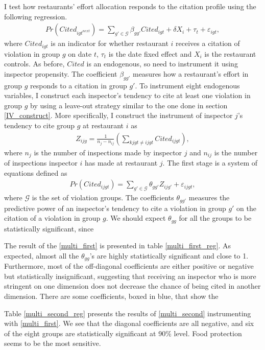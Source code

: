 \documentclass[11pt]{article}
\begin{document}
I test how restaurants' effort allocation responds to the citation profile using the following regression. 
\begin{align}
\label{multi_second}
    Pr(Cited_{igt^{next}}) = \sum_{g' \in \mathcal{G}} \beta_{gg'} Cited_{igt} + \delta X_i + \tau_t + \varepsilon_{igt},
\end{align}
where $Cited_{igt}$ is an indicator for whether restaurant $i$ receives a citation of violation in group $g$ on date $t$, $\tau_t$ is the date fixed effect and $X_i$ is the restaurant controls. As before, $Cited$ is an endogenous, so need to instrument it using inspector propensity. The coefficient $\beta_{gg'}$ measures how a restaurant's effort in group $g$ responds to a citation in group $g'$. To instrument eight endogenous variables, I construct each inspector's tendency to cite at least one violation in group $g$ by using a leave-out strategy similar to the one done in section \ref{IV_construct}. More specifically, I construct the instrument of inspector $j$'s tendency to cite group $g$ at restaurant $i$ as
\begin{align*}
  Z_{ijg} = \frac{1}{n_j - n_{ij}} \left(\sum_{kjgt \neq ijgt} Cited_{ijgt}\right),
\end{align*}
where $n_j$ is the number of inspections made by inspector $j$ and $n_{ij}$ is the number of inspections inspector $i$ has made at restaurant $j$. The first stage is a system of equations defined as
\begin{align}
\label{multi_first}
    Pr(Cited_{ijgt}) = \sum_{g'\in \mathcal{G}} \theta_{gg'}Z_{ijg'} + \varepsilon_{ijgt}, 
\end{align}
where $\mathcal{G}$ is the set of violation groups. The coefficients $\theta_{gg'}$ measures the predictive power of an inspector's tendency to cite a violation in group $g'$ on the citation of a violation in group $g$. We should expect $\theta_{gg}$ for all the groups to be statistically significant, since 

The result of the \eqref{multi_first} is presented in table \ref{multi_first_reg}. As expected, almost all the $\theta_{gg}$'s are highly statistically significant and close to 1. Furthermore, most of the off-diagonal coefficients are either positive or negative but statistically insignificant, suggesting that receiving an inspector who is more stringent on one dimension does not decrease the chance of being cited in another dimension. There are some coefficients, boxed in blue, that show the 

Table \ref{multi_second_reg} presents the results of \eqref{multi_second} instrumenting with \eqref{multi_first}. We see that the diagonal coefficients are all negative, and six of the eight groups are statistically significant at 90\% level. Food protection seems to be the most sensitive. 
\end{document}
